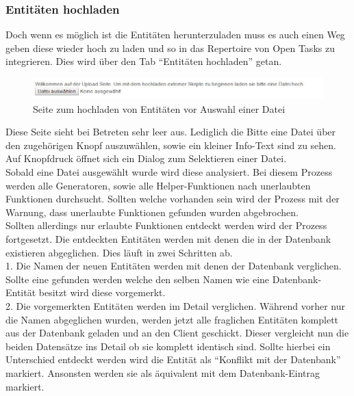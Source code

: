 \subsubsection{Entitäten hochladen}

Doch wenn es möglich ist die Entitäten herunterzuladen muss es auch einen Weg geben diese wieder hoch zu laden und so in das Repertoire von Open Tasks zu integrieren. Dies wird über den Tab ``Entitäten hochladen'' getan. \\

\begin{figure}[htp]     %
\centering
\includegraphics[width=1\textwidth]{bilder/UploadNoSelect} 
\caption[Seite zum hochladen von Entitäten vor Auswahl einer Datei]{Seite zum hochladen von Entitäten vor Auswahl einer Datei}
\end{figure} 

Diese Seite sieht bei Betreten sehr leer aus. Lediglich die Bitte eine Datei über den zugehörigen Knopf auszuwählen, sowie ein kleiner Info-Text sind zu sehen. Auf Knopfdruck öffnet sich ein Dialog zum Selektieren einer Datei. \\
Sobald eine Datei ausgewählt wurde wird diese analysiert. Bei diesem Prozess werden alle Generatoren, sowie alle Helper-Funktionen nach unerlaubten Funktionen durchsucht. Sollten welche vorhanden sein wird der Prozess mit der Warnung, dass unerlaubte Funktionen gefunden wurden abgebrochen. \\

Sollten allerdings nur erlaubte Funktionen entdeckt werden wird der Prozess fortgesetzt. Die entdeckten Entitäten werden mit denen die in der Datenbank existieren abgeglichen. Dies läuft in zwei Schritten ab.\\

1. Die Namen der neuen Entitäten werden mit denen der Datenbank verglichen. Sollte eine gefunden werden welche den selben Namen wie eine Datenbank-Entität besitzt wird diese vorgemerkt.\\

2. Die vorgemerkten Entitäten werden im Detail verglichen. Während vorher nur die Namen abgeglichen wurden, werden jetzt alle fraglichen Entitäten komplett aus der Datenbank geladen und an den Client geschickt. Dieser vergleicht nun die beiden Datensätze ins Detail ob sie komplett identisch sind. Sollte hierbei ein Unterschied entdeckt werden wird die Entität als ``Konflikt mit der Datenbank'' markiert. Ansonsten werden sie als äquivalent mit dem Datenbank-Eintrag markiert. \\

